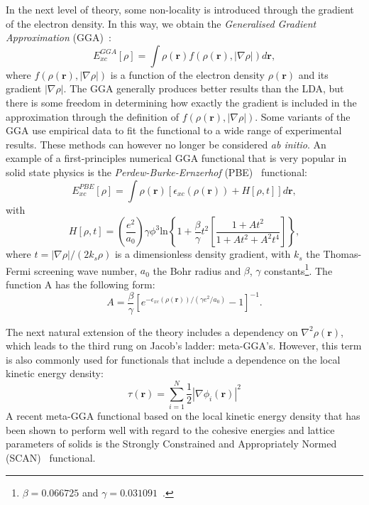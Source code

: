 \begin{refsection}
In the next level of theory, some non-locality is introduced through the gradient of the electron density. In this way, we obtain the \textit{Generalised Gradient Approximation} (GGA)~\cite{Perdew1992}:
\begin{equation}
E_{xc}^{GGA}[\rho] = \int \rho(\mathbf{r}) f(\rho(\mathbf{r}),\left| \nabla \rho\right|)d\mathbf{r},
\end{equation}
where $f(\rho(\mathbf{r}),\left| \nabla \rho\right|)$ is a function of the electron density $\rho(\mathbf{r})$ and its gradient $\left| \nabla \rho\right|$. The GGA generally produces better results than the LDA, but there is some freedom in determining how exactly the gradient is included in the approximation through the definition of $f(\rho(\mathbf{r}),\left| \nabla \rho\right|)$. Some variants of the GGA use empirical data to fit the functional to a wide range of experimental results. These methods can however no longer be considered \textit{ab initio}. An example of a first-principles numerical GGA functional that is very popular in solid state physics is the \textit{Perdew-Burke-Ernzerhof} (PBE)~\cite{Perdew1996} functional:
\begin{equation}
E_{xc}^{PBE}[\rho] = \int \rho(\mathbf{r}) \left[ \epsilon_{xc}(\rho(\mathbf{r})) + H[\rho,t] \right] d\mathbf{r},
\end{equation}
with
\begin{equation}
H[\rho,t] = \left( \frac{e^2}{a_0} \right) \gamma \phi^3 \text{ln} \left\{ 1 + \frac{\beta}{\gamma} t^2 \left[ \frac{1 + A t^2}{1 + A t^2 + A^2 t^4} \right] \right\},
\end{equation}
where $t = \left| \nabla \rho \right|/(2 k_s\rho)$ is a dimensionless density gradient, with $k_s$ the Thomas-Fermi screening wave number, $a_0$ the Bohr radius and $\beta$, $\gamma$ constants\footnote{$\beta = 0.066725$ and $\gamma = 0.031091$~\cite{Kohanoff2006}.}. The function A has the following form:
\begin{equation}
A = \frac{\beta}{\gamma} \left[ e^{-\epsilon_{xc}(\rho(\mathbf{r}))/(\gamma e^2 /a_0)} - 1 \right]^{-1}.
\end{equation}

The next natural extension of the theory includes a dependency on $\nabla^2 \rho(\mathbf{r})$, which leads to the third rung on Jacob's ladder: meta-GGA's. However, this term is also commonly used for functionals that include a dependence on the local kinetic energy density:
\begin{equation}
\tau (\mathbf{r}) = \sum_{i=1}^N \frac{1}{2} \left| \nabla \phi_i (\mathbf{r}) \right|^2
\end{equation}
A recent meta-GGA functional based on the local kinetic energy density that has been shown to perform well with regard to the cohesive energies and lattice parameters of solids is the Strongly Constrained and Appropriately Normed (SCAN)~\cite{Sun2015} functional.


\end{refsection}
